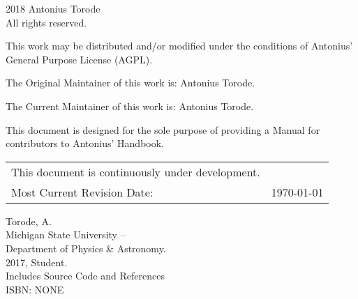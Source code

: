 \pagestyle{empty}
\begingroup
\footnotesize
\parindent 0pt
\parskip \baselineskip
\textcopyright{} 2018 Antonius Torode \\
All rights reserved.

This work may be distributed and/or modified under the conditions of Antonius’ General Purpose License (AGPL).

The Original Maintainer of this work is: Antonius Torode.

The Current Maintainer of this work is: Antonius Torode.

This document is designed for the sole purpose of providing a Manual for contributors to Antonius' Handbook.


\begin{center}
\begin{tabular}{ll}
This document is continuously under development. \\
Most Current Revision Date: &  \today 
\end{tabular}
\end{center}

\vfill

Torode, A.\\
\hspace*{2em} Michigan State University -- \\
\hspace*{2em} Department of Physics \& Astronomy. \\
\hspace*{2em} 2017, Student. \\
\hspace*{2em} Includes Source Code and References \\
\hspace*{2em} ISBN: NONE \\



\endgroup
\clearpage